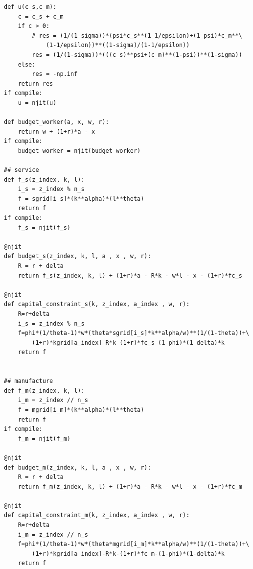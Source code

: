 \documentclass[a4paper, 12pt]{ctexart}
\begin{document}
\begin{lstlisting}
def u(c_s,c_m):
    c = c_s + c_m
    if c > 0:
        # res = (1/(1-sigma))*(psi*c_s**(1-1/epsilon)+(1-psi)*c_m**\
            (1-1/epsilon))**((1-sigma)/(1-1/epsilon))
        res = (1/(1-sigma))*(((c_s)**psi+(c_m)**(1-psi))**(1-sigma))
    else:
        res = -np.inf
    return res
if compile:
    u = njit(u)

def budget_worker(a, x, w, r):
    return w + (1+r)*a - x
if compile:
    budget_worker = njit(budget_worker)

## service
def f_s(z_index, k, l):
    i_s = z_index % n_s
    f = sgrid[i_s]*(k**alpha)*(l**theta)
    return f
if compile:
    f_s = njit(f_s)

@njit
def budget_s(z_index, k, l, a , x , w, r):
    R = r + delta
    return f_s(z_index, k, l) + (1+r)*a - R*k - w*l - x - (1+r)*fc_s

@njit
def capital_constraint_s(k, z_index, a_index , w, r):
    R=r+delta
    i_s = z_index % n_s
    f=phi*(1/theta-1)*w*(theta*sgrid[i_s]*k**alpha/w)**(1/(1-theta))+\
        (1+r)*kgrid[a_index]-R*k-(1+r)*fc_s-(1-phi)*(1-delta)*k
    return f


## manufacture
def f_m(z_index, k, l):
    i_m = z_index // n_s
    f = mgrid[i_m]*(k**alpha)*(l**theta)
    return f
if compile:
    f_m = njit(f_m)

@njit
def budget_m(z_index, k, l, a , x , w, r):
    R = r + delta
    return f_m(z_index, k, l) + (1+r)*a - R*k - w*l - x - (1+r)*fc_m

@njit
def capital_constraint_m(k, z_index, a_index , w, r):
    R=r+delta
    i_m = z_index // n_s
    f=phi*(1/theta-1)*w*(theta*mgrid[i_m]*k**alpha/w)**(1/(1-theta))+\
        (1+r)*kgrid[a_index]-R*k-(1+r)*fc_m-(1-phi)*(1-delta)*k
    return f

\end{lstlisting}
\end{document}
